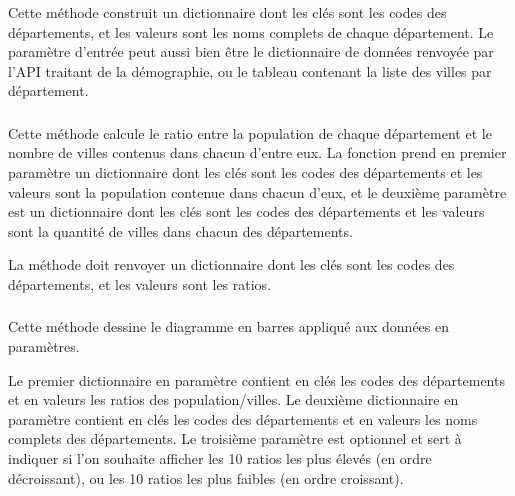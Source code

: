 \bigskip


\subsubsection*{}

\noindent Cette méthode construit un dictionnaire dont les clés sont les codes des départements, et les valeurs sont les noms complets de chaque département.
Le paramètre d'entrée peut aussi bien être le dictionnaire de données renvoyée par l'API traitant de la démographie, ou le tableau contenant la liste des villes par département.


\bigskip


\subsubsection*{}

\noindent Cette méthode calcule le ratio entre la population de chaque département et le nombre de villes contenus dans chacun d'entre eux.
La fonction prend en premier paramètre un dictionnaire dont les clés sont les codes des départements et les valeurs sont la population contenue dans chacun d'eux, et le deuxième paramètre est un dictionnaire dont les clés sont les codes des départements et les valeurs sont la quantité de villes dans chacun des départements.

\noindent La méthode doit renvoyer un dictionnaire dont les clés sont les codes des départements, et les valeurs sont les ratios.


\bigskip


\subsubsection*{}

\noindent Cette méthode dessine le diagramme en barres appliqué aux données en paramètres.

\noindent Le premier dictionnaire en paramètre contient en clés les codes des départements et en valeurs les ratios des population/villes.
Le deuxième dictionnaire en paramètre contient en clés les codes des départements et en valeurs les noms complets des départements.
Le troisième paramètre est optionnel et sert à indiquer si l'on souhaite afficher les 10 ratios les plus élevés (en ordre décroissant), ou les 10 ratios les plus faibles (en ordre croissant).

